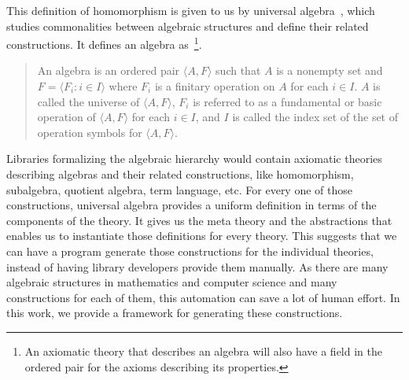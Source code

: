 This definition of homomorphism is given to us by universal algebra~\cite{whitehead1898treatise}, which studies commonalities between algebraic structures and define their related constructions.
It defines an algebra as~\cite{mckenzie1987algebras}\footnote{An axiomatic theory that describes an algebra will also have a field in the ordered pair for the axioms describing its properties.}. 
\begin{quote}
    An algebra is an ordered pair $\langle A, F \rangle$ such that $A$ is a nonempty set and $F = \langle F_i : i \in I \rangle$ where $F_i$ is a finitary operation on $A$ for each $i \in I$. $A$ is called the universe of $\langle A, F \rangle$, $F_i$ is referred to as a fundamental or basic operation of $\langle A, F \rangle$ for each $i \in I$, and $I$ is called the index set of the set of operation symbols for $\langle A, F \rangle$. 
\end{quote}
Libraries formalizing the algebraic hierarchy would contain axiomatic theories describing algebras and their related constructions, like homomorphism, subalgebra, quotient algebra, term language, etc. 
For every one of those constructions, universal algebra provides a uniform definition in terms of the components of the theory. 
It gives us the meta theory and the abstractions that enables us to instantiate those definitions for every theory. This suggests that we can have a program generate those constructions for the individual theories, instead of having library developers provide them manually. As there are many algebraic structures in mathematics and computer science and many constructions for each of them, this automation can save a lot of human effort. In this work, we provide a framework for generating these constructions. 

